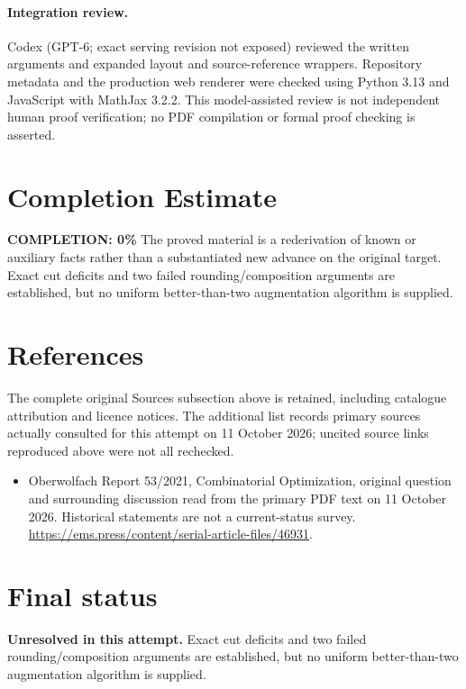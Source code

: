\documentclass[11pt]{article}
\begin{document}
\paragraph{Integration review.} Codex (GPT-6; exact serving revision not exposed) reviewed the written arguments and expanded layout and source-reference wrappers. Repository metadata and the production web renderer were checked using Python 3.13 and JavaScript with MathJax 3.2.2. This model-assisted review is not independent human proof verification; no PDF compilation or formal proof checking is asserted.

\section{Completion Estimate}
\noindent\textbf{COMPLETION: 0\%}
The proved material is a rederivation of known or auxiliary facts rather than a substantiated new advance on the original target. Exact cut deficits and two failed rounding/composition arguments are established, but no uniform better-than-two augmentation algorithm is supplied.
\section{References}
The complete original Sources subsection above is retained, including catalogue attribution and licence notices. The additional list records primary sources actually consulted for this attempt on 11 October 2026; uncited source links reproduced above were not all rechecked.
\begin{itemize}
\item Oberwolfach Report 53/2021, Combinatorial Optimization, original question and surrounding discussion read from the primary PDF text on 11 October 2026. Historical statements are not a current-status survey. \url{https://ems.press/content/serial-article-files/46931}.
\end{itemize}
\section{Final status}
\textbf{Unresolved in this attempt.} Exact cut deficits and two failed rounding/composition arguments are established, but no uniform better-than-two augmentation algorithm is supplied.
\end{document}
